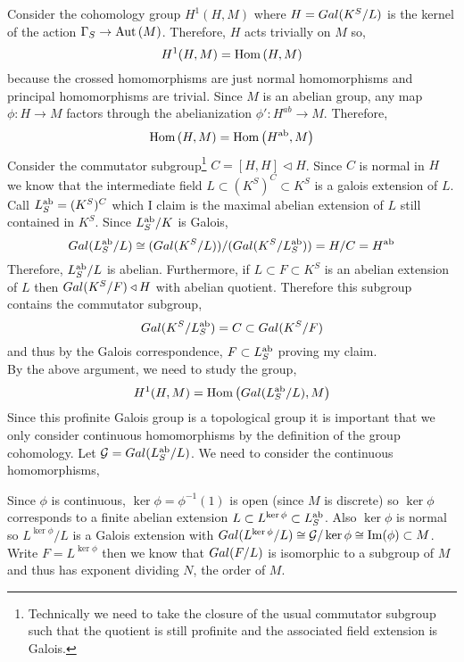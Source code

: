 \documentclass[12pt]{extarticle}
\begin{document}
Consider the cohomology group $H^1(H, M)$ where $H = Gal \small(K^S/L \small)$ is the kernel of the action $\Gamma_S \to \mathrm{Aut}\left( M \right)$. Therefore, $H$ acts trivially on $M$ so,
\[ H^1(H, M) = \mathrm{Hom}\left(H, M\right) \]
because the crossed homomorphisms are just normal homomorphisms and principal homomorphisms are trivial. Since $M$ is an abelian group, any map $\phi : H \to M$ factors through the abelianization $\phi' : H^{ab} \to M$. Therefore,
\[ \mathrm{Hom}\left(H, M\right) = \mathrm{Hom}\left(H^{\mathrm{ab}}, M\right) \] 
Consider the commutator subgroup\footnote{Technically we need to take the closure of the usual commutator subgroup such that the quotient is still profinite and the associated field extension is Galois.} $C = [H, H] \triangleleft H$. Since $C$ is normal in $H$ we know that the intermediate field $L \subset (K^S)^C \subset K^S$ is a galois extension of $L$. Call $L^{\mathrm{ab}}_S = (K^S)^C$ which I claim is the maximal abelian extension of $L$ still contained in $K^S$. Since $L_S^{\mathrm{ab}} / K$ is Galois,
\[ Gal \small(L_S^{\mathrm{ab}} / L \small) \cong (Gal \small(K^S / L \small)) / (Gal \small(K^S / L_S^{\mathrm{ab}} \small) ) = H / C = H^{\mathrm{ab}} \]
Therefore, $L_S^{\mathrm{ab}} / L$ is abelian. Furthermore, if $L \subset F \subset K^S$ is an abelian extension of $L$ then $Gal \small(K^S/F \small) \triangleleft H$ with abelian quotient. Therefore this subgroup contains the commutator subgroup,
\[ Gal \small(K^S / L_S^{\mathrm{ab}} \small) = C \subset Gal \small(K^S/F \small)  \]
and thus by the Galois correspondence, $F \subset L_S^{\mathrm{ab}}$ proving my claim. 
\bigskip\\ 
By the above argument, we need to study the group,
\[ H^1(H, M) = \mathrm{Hom}\left(Gal \small(L^{\mathrm{ab}}_S / L \small), M\right) \] 
Since this profinite Galois group is a topological group it is important that we only consider continuous homomorphisms by the definition of the group cohomology.
Let $\mathcal{G} = Gal \small(L^{\mathrm{ab}}_{S} / L \small)$. We need to consider the continuous homomorphisms,
\begin{center}
\end{center}
Since $\phi$ is continuous, $\ker{\phi} = \phi^{-1}(1)$ is open (since $M$ is discrete) so $\ker{\phi}$ corresponds to a finite abelian extension $L \subset L^{\ker{\phi}} \subset L^{\mathrm{ab}}_{S}$. Also $\ker{\phi}$ is normal so $L^{\ker{\phi}} / L$ is a Galois extension with $Gal \small(L^{\ker{\phi}} / L \small) \cong \mathcal{G} / \ker{\phi} \cong \mathrm{Im}(\phi) \subset M$. Write $F = L^{\ker{\phi}}$ then we know that $Gal \small(F/L \small)$ is isomorphic to a subgroup of $M$ and thus has exponent dividing $N$, the order of $M$.
\end{document}
